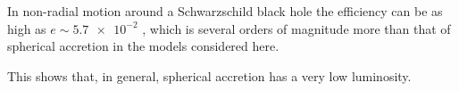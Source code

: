 \documentclass[main.tex]{subfiles}
\begin{document}
In non-radial motion around a Schwarzschild black hole the efficiency can be as high as \(e \sim \num{5.7e-2}\) \cite[eq. 2.8.5]{Nobili:2000}, which is several orders of magnitude more than that of spherical accretion in the models considered here.

This shows that, in general, spherical accretion has a very low luminosity.
\end{document}

